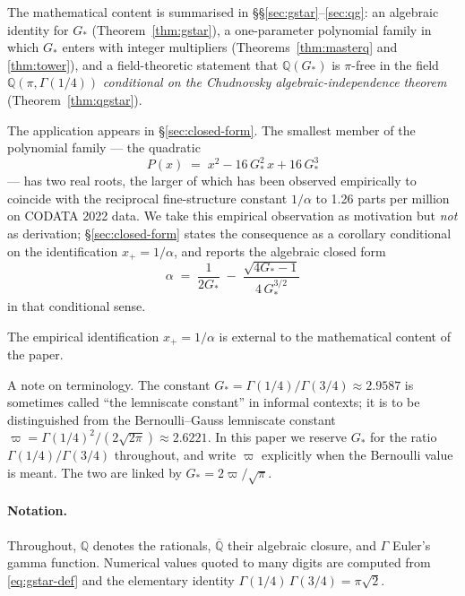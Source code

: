 \documentclass[11pt,reqno]{amsart}
\theoremstyle{plain}
\theoremstyle{definition}
\theoremstyle{remark}
\numberwithin{equation}{section}
\newcommand{\Gstar}{G_{\!*}}
\begin{document}
The mathematical content is summarised in
\S\S\ref{sec:gstar}--\ref{sec:qg}: an algebraic identity for $\Gstar$
(Theorem~\ref{thm:gstar}), a one-parameter polynomial family in
which $\Gstar$ enters with integer multipliers
(Theorems~\ref{thm:masterq} and \ref{thm:tower}), and a
field-theoretic statement that
$\mathbb{Q}(\Gstar)$ is $\pi$-free in the field
$\mathbb{Q}(\pi, \Gamma(1/4))$ \emph{conditional on the Chudnovsky
algebraic-independence theorem} (Theorem~\ref{thm:qgstar}).

The application appears in \S\ref{sec:closed-form}. The smallest
member of the polynomial family --- the quadratic
\begin{equation}
\label{eq:masterq-intro}
  P(x) \;=\; x^{2} - 16\,\Gstar^{2}\,x + 16\,\Gstar^{3}
\end{equation}
--- has two real roots, the larger of which has been observed
empirically to coincide with the reciprocal fine-structure constant
$1/\alpha$ to 1.26 parts per million on CODATA 2022 data. We take this
empirical observation as motivation but \emph{not} as derivation;
\S\ref{sec:closed-form} states the consequence as a corollary
conditional on the identification $x_{+} = 1/\alpha$, and reports the
algebraic closed form
\[
  \alpha \;=\; \frac{1}{2\Gstar} \;-\; \frac{\sqrt{4\Gstar - 1}}{4\,\Gstar^{3/2}}
\]
in that conditional sense.

The empirical identification $x_{+} = 1/\alpha$ is external to the
mathematical content of the paper.

A note on terminology. The constant $\Gstar = \Gamma(1/4)/\Gamma(3/4)
\approx 2.9587$ is sometimes called ``the lemniscate constant'' in
informal contexts; it is to be distinguished from the
Bernoulli--Gauss lemniscate constant $\varpi = \Gamma(1/4)^{2}/(2\sqrt{2\pi})
\approx 2.6221$. In this paper we reserve $\Gstar$ for the ratio
$\Gamma(1/4)/\Gamma(3/4)$ throughout, and write $\varpi$ explicitly
when the Bernoulli value is meant. The two are linked by
$\Gstar = 2\varpi/\sqrt{\pi}$.

\paragraph{Notation.} Throughout, $\mathbb{Q}$ denotes the rationals,
$\overline{\mathbb{Q}}$ their algebraic closure, and $\Gamma$ Euler's
gamma function. Numerical values quoted to many digits are computed
from \eqref{eq:gstar-def} and the elementary identity
$\Gamma(1/4)\,\Gamma(3/4) = \pi\sqrt{2}$.

\end{document}

